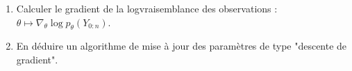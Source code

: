 \documentclass[a4paper,10pt,fleqn]{article}
\newcommand{\1}{\ensuremath{\mathbbm{1}}}
\begin{document}
\begin{enumerate}
%
%
\item Calculer le gradient de la logvraisemblance des observations : $\theta\mapsto\nabla_\theta \log p_\theta(Y_{0:n})$.
%
%
\item En d\'eduire un algorithme de mise \`a jour des param\`etres de type "descente de gradient".
%
%

\end{enumerate}
\end{document}
